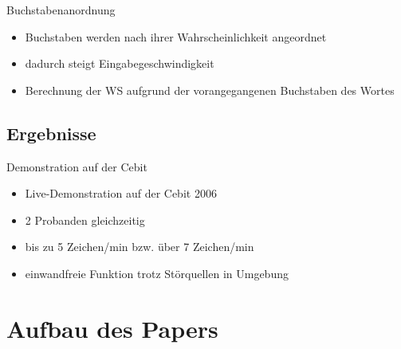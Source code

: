 \documentclass{beamer}
\begin{document}
		\begin{frame}[<+->]{Buchstabenanordnung}
		  \begin{block}{}
		    \begin{itemize}
		      \item Buchstaben werden nach ihrer Wahrscheinlichkeit angeordnet
		      \item dadurch steigt Eingabegeschwindigkeit
		      \item Berechnung der WS aufgrund der vorangegangenen Buchstaben des Wortes
		    \end{itemize}
		  \end{block}
		\end{frame}
		
		\subsection{Ergebnisse}
		\begin{frame}[<+->]{Demonstration auf der Cebit}
		  \begin{block}{}
		    \begin{itemize}
		      \item Live-Demonstration auf der Cebit 2006
		      \item 2 Probanden gleichzeitig
		      \item bis zu 5 Zeichen/min bzw. über 7 Zeichen/min
		      \item einwandfreie Funktion trotz Störquellen in Umgebung
		    \end{itemize}
		  \end{block}
		\end{frame}
		
				
  \section{Aufbau des Papers}
    
\end{document}
